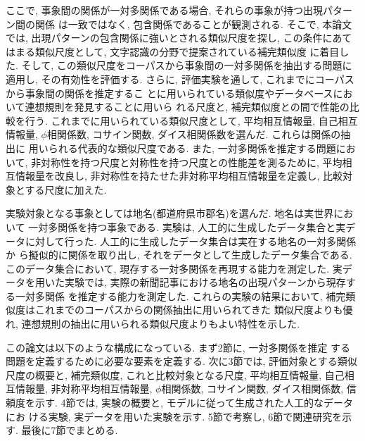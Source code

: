 ここで, 事象間の関係が一対多関係である場合, それらの事象が持つ出現パターン間の関係
は一致ではなく, 包含関係であることが観測される. 
そこで, 本論文では, 出現パターンの包含関係に強いとされる類似尺度を探し, 
この条件にあてはまる類似尺度として, 文字認識の分野で提案されている補完類似度
\cite{Hagita95}に着目した. 
そして, この類似尺度をコーパスから事象間の一対多関係を抽出する問題に適用し, 
その有効性を評価する. 
さらに, 評価実験を通して, 
これまでにコーパスから事象間の関係を推定するこ
とに用いられている類似度やデータベースにおいて連想規則を発見することに用いら
れる尺度と, 補完類似度との間で性能の比較を行う. 
これまでに用いられている類似尺度として, 平均相互情報量, 自己相互情報量, 
$\phi$相関係数, コサイン関数, ダイス相関係数を選んだ. これらは関係の抽出に
用いられる代表的な類似尺度である. 
また, 一対多関係を推定する問題において, 非対称性を持つ尺度と対称性を持つ尺度との性能差を測るために, 平均相互情報量を改良し, 非対称性を持たせた非対称平均相互情報量を定義し, 比較対象とする尺度に加えた. 

実験対象となる事象としては地名(都道府県市郡名)を選んだ. 地名は実世界において
一対多関係を持つ事象である. 
実験は, 人工的に生成したデータ集合と実データに対して行った. 
人工的に生成したデータ集合は実在する地名の一対多関係か
ら擬似的に関係を取り出し, それをデータとして生成したデータ集合である. 
このデータ集合において, 現存する一対多関係を再現する能力を測定した. 
実データを用いた実験では, 実際の新聞記事における地名の出現パターンから現存する一対多関係
を推定する能力を測定した. 
これらの実験の結果において, 
補完類似度はこれまでのコーパスからの関係抽出に用いられてきた
類似尺度よりも優れ, 
連想規則の抽出に用いられる類似尺度よりもよい特性を示した. 

この論文は以下のような構成になっている. まず2節に, 一対多関係を推定
する問題を定義するために必要な要素を定義する. 次に3節では, 
評価対象とする類似尺度の概要と, 補完類似度, これと比較対象となる尺度, 
平均相互情報量, 自己相互情報量, 非対称平均相互情報量, $\phi$相関係数, コサイン関数, ダイス相関係数, 信頼度を示す. 
4節では, 実験の概要と, モデルに従って生成された人工的なデータにお
ける実験, 実データを用いた実験を示す. 
5節で考察し, 6節で関連研究を示す. 最後に7節でまとめる. 

